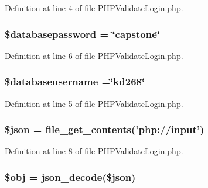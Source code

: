 Definition at line 4 of file P\-H\-P\-Validate\-Login.\-php.

\hypertarget{_p_h_p_validate_login_8php_a1a07536b6a5f43f2d8f826bd2ee6c91a}{
\subsubsection[{\$databasepassword}]{\setlength{\rightskip}{0pt plus 5cm}\$databasepassword = \char`\"{}capstone\char`\"{}}}\label{_p_h_p_validate_login_8php_a1a07536b6a5f43f2d8f826bd2ee6c91a}


Definition at line 6 of file P\-H\-P\-Validate\-Login.\-php.

\hypertarget{_p_h_p_validate_login_8php_a251bf75f510d7c8b556c65d7c30e911f}{
\subsubsection[{\$databaseusername}]{\setlength{\rightskip}{0pt plus 5cm}\$databaseusername =\char`\"{}kd268\char`\"{}}}\label{_p_h_p_validate_login_8php_a251bf75f510d7c8b556c65d7c30e911f}


Definition at line 5 of file P\-H\-P\-Validate\-Login.\-php.

\hypertarget{_p_h_p_validate_login_8php_acedd13b51401130848ce18f4d5c52605}{
\subsubsection[{\$json}]{\setlength{\rightskip}{0pt plus 5cm}\$json = file\-\_\-get\-\_\-contents('php\-://input')}}\label{_p_h_p_validate_login_8php_acedd13b51401130848ce18f4d5c52605}


Definition at line 8 of file P\-H\-P\-Validate\-Login.\-php.

\hypertarget{_p_h_p_validate_login_8php_a9008ed94ba185855b1723e367744b87e}{
\subsubsection[{\$obj}]{\setlength{\rightskip}{0pt plus 5cm}\$obj = json\-\_\-decode(\$json)}}\label{_p_h_p_validate_login_8php_a9008ed94ba185855b1723e367744b87e}


